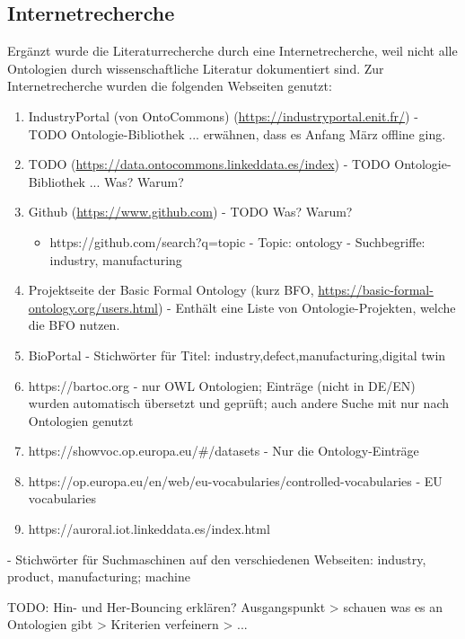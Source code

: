 \documentclass{article}
\begin{document}
\subsection{Internetrecherche}

Ergänzt wurde die Literaturrecherche durch eine Internetrecherche, weil nicht alle Ontologien durch wissenschaftliche Literatur dokumentiert sind.
Zur Internetrecherche wurden die folgenden Webseiten genutzt:

\begin{enumerate}
    \item IndustryPortal (von OntoCommons) (\url{https://industryportal.enit.fr/}) - TODO Ontologie-Bibliothek ... erwähnen, dass es Anfang März offline ging.
    \item TODO (\url{https://data.ontocommons.linkeddata.es/index}) - TODO Ontologie-Bibliothek ... Was? Warum?
    \item Github (\url{https://www.github.com}) - TODO Was? Warum?
       \begin{itemize}
           \item https://github.com/search?q=topic%
           - Topic: ontology
           - Suchbegriffe: industry, manufacturing
       \end{itemize}
    \item Projektseite der Basic Formal Ontology (kurz BFO, \url{https://basic-formal-ontology.org/users.html}) - Enthält eine Liste von Ontologie-Projekten, welche die BFO nutzen.
    \item BioPortal - Stichwörter für Titel: industry,defect,manufacturing,digital twin
    \item https://bartoc.org - nur OWL Ontologien; Einträge (nicht in DE/EN) wurden automatisch übersetzt und geprüft;  auch andere Suche mit nur nach Ontologien genutzt
    \item https://showvoc.op.europa.eu/\#/datasets - Nur die Ontology-Einträge
    \item https://op.europa.eu/en/web/eu-vocabularies/controlled-vocabularies - EU vocabularies
    \item https://auroral.iot.linkeddata.es/index.html
\end{enumerate}

- Stichwörter für Suchmaschinen auf den verschiedenen Webseiten: industry, product, manufacturing; machine

TODO: Hin- und Her-Bouncing erklären? Ausgangspunkt > schauen was es an Ontologien gibt > Kriterien verfeinern > ...
\end{document}
